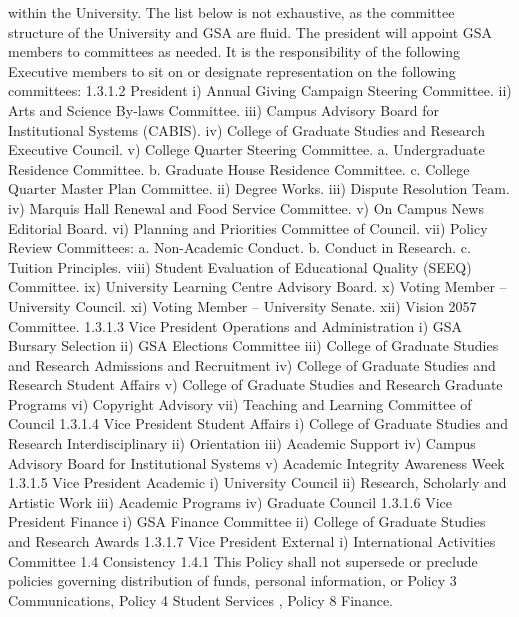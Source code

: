 within the University. The list below is not exhaustive, as the committee structure of the University and GSA are fluid. The president will appoint GSA members to committees as needed. It is the responsibility of the following Executive members to sit on or designate representation on the following committees: 1.3.1.2 President i) Annual Giving Campaign Steering Committee. ii) Arts and Science By-laws Committee. iii) Campus Advisory Board for Institutional Systems (CABIS). iv) College of Graduate Studies and Research Executive Council. v) College Quarter Steering Committee. a. Undergraduate Residence Committee. b. Graduate House Residence Committee. c. College Quarter Master Plan Committee. ii) Degree Works. iii) Dispute Resolution Team. iv) Marquis Hall Renewal and Food Service Committee. v) On Campus News Editorial Board. vi) Planning and Priorities Committee of Council. vii) Policy Review Committees: a. Non-Academic Conduct. b. Conduct in Research. c. Tuition Principles. viii) Student Evaluation of Educational Quality (SEEQ) Committee. ix) University Learning Centre Advisory Board. x) Voting Member – University Council. xi) Voting Member – University Senate. xii) Vision 2057 Committee. 1.3.1.3 Vice President Operations and Administration i) GSA Bursary Selection ii) GSA Elections Committee iii) College of Graduate Studies and Research Admissions and Recruitment iv) College of Graduate Studies and Research Student Affairs v) College of Graduate Studies and Research Graduate Programs vi) Copyright Advisory vii) Teaching and Learning Committee of Council 1.3.1.4 Vice President Student Affairs i) College of Graduate Studies and Research Interdisciplinary ii) Orientation iii) Academic Support iv) Campus Advisory Board for Institutional Systems v) Academic Integrity Awareness Week 1.3.1.5 Vice President Academic i) University Council ii) Research, Scholarly and Artistic Work iii) Academic Programs iv) Graduate Council 1.3.1.6 Vice President Finance i) GSA Finance Committee ii) College of Graduate Studies and Research Awards 1.3.1.7 Vice President External i) International Activities Committee 1.4 Consistency 1.4.1 This Policy shall not supersede or preclude policies governing distribution of funds, personal information, or Policy 3 Communications, Policy 4 Student Services , Policy 8 Finance. 